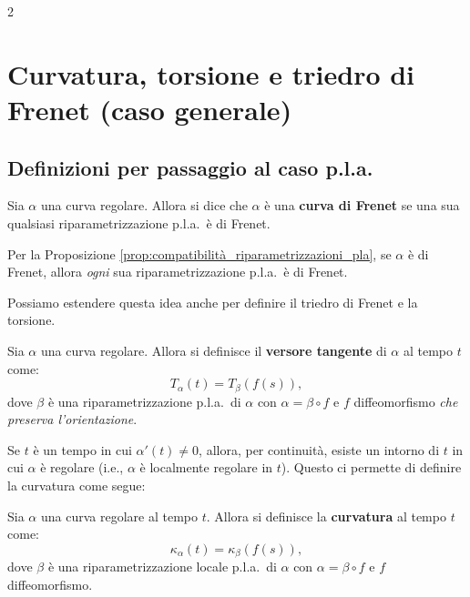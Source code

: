 \begin{multicols*}{2}
    \section{Curvatura, torsione e triedro di Frenet (caso generale)}

    \subsection{Definizioni per passaggio al caso p.l.a.}

    \begin{definition}
        Sia $\alpha$ una curva regolare. Allora si dice che $\alpha$
        è una \textbf{curva di Frenet} se una sua qualsiasi
        riparametrizzazione p.l.a.~è di Frenet.
    \end{definition}

    \begin{remark}
        Per la Proposizione \ref{prop:compatibilità_riparametrizzazioni_pla},
        se $\alpha$ è di Frenet, allora \textit{ogni} sua riparametrizzazione
        p.l.a.~è di Frenet. \smallskip

        Possiamo estendere questa idea anche per definire il triedro di Frenet
        e la torsione.
    \end{remark}

    \begin{definition}
        Sia $\alpha$ una curva regolare. Allora si definisce
        il \textbf{versore tangente} di $\alpha$ al tempo $t$ come:
        \[
            T_\alpha(t) = T_\beta(f(s)),
        \]
        dove $\beta$ è una riparametrizzazione p.l.a.~di $\alpha$ con
        $\alpha = \beta \circ f$ e $f$ diffeomorfismo \textit{che preserva
            l'orientazione}.
    \end{definition}

    \begin{remark}
        Se $t$ è un tempo in cui $\alpha'(t) \neq 0$, allora, per
        continuità, esiste un intorno di $t$ in cui $\alpha$ è regolare (i.e.,
        $\alpha$ è localmente regolare in $t$). Questo ci permette di definire
        la curvatura come segue:
    \end{remark}

    \begin{definition}[Curvatura]
        Sia $\alpha$ una curva regolare al tempo $t$. Allora si definisce
        la \textbf{curvatura} al tempo $t$ come:
        \[
            \kappa_\alpha(t) = \kappa_\beta(f(s)),
        \]
        dove $\beta$ è una riparametrizzazione locale p.l.a.~di $\alpha$ con
        $\alpha = \beta \circ f$ e $f$ diffeomorfismo. \smallskip


\end{definition}
\end{multicols*}
